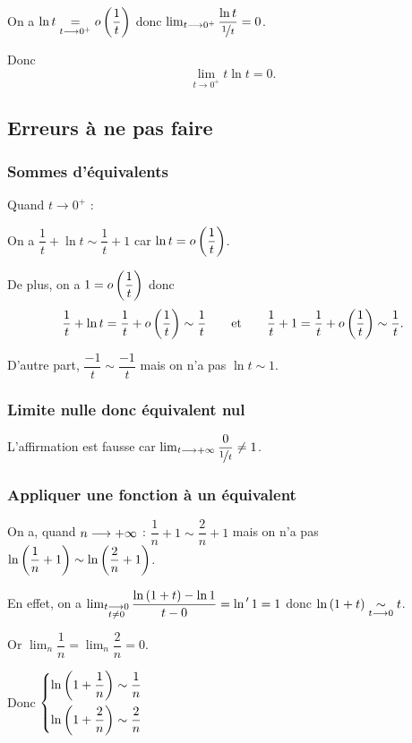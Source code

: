 \begin{corr}
On a \(\ln t\egqd{t\to0^+}\o{\dfrac{1}{t}}\) donc \(\lim_{t\to0^+}\dfrac{\ln t}{\nicefrac{1}{t}}=0\).

Donc \[\lim_{t\to0^+}t\ln t=0.\]
\end{corr}

\subsection{Erreurs à ne pas faire}

\subsubsection{Sommes d'équivalents}

Quand \(t\to0^+\) :

On a \(\dfrac{1}{t}+\ln t\sim\dfrac{1}{t}+1\) car \(\ln t=\o{\dfrac{1}{t}}\).

De plus, on a \(1=\o{\dfrac{1}{t}}\) donc \[\dfrac{1}{t}+\ln t=\dfrac{1}{t}+\o{\dfrac{1}{t}}\sim\dfrac{1}{t}\qquad\text{et}\qquad\dfrac{1}{t}+1=\dfrac{1}{t}+\o{\dfrac{1}{t}}\sim\dfrac{1}{t}.\]

D'autre part, \(\dfrac{-1}{t}\sim\dfrac{-1}{t}\) mais on n'a pas \(\ln t\sim1\).

\subsubsection{Limite nulle donc équivalent nul}

L'affirmation  est fausse car \(\lim_{t\to\pinf}\dfrac{0}{\nicefrac{1}{t}}\not=1\).

\subsubsection{Appliquer une fonction à un équivalent}

On a, quand \(n\to\pinf\) : \(\dfrac{1}{n}+1\sim\dfrac{2}{n}+1\) mais on n'a pas \(\ln\paren{\dfrac{1}{n}+1}\sim\ln\paren{\dfrac{2}{n}+1}\).

En effet, on a \(\lim_{\substack{t\to0 \\ t\not=0}}\dfrac{\ln\paren{1+t}-\ln1}{t-0}=\ln\prim1=1\) donc \(\ln\paren{1+t}\simqd{t\to0}t\).

Or \(\lim_n\dfrac{1}{n}=\lim_n\dfrac{2}{n}=0\).

Donc \(\begin{dcases}
\ln\paren{1+\dfrac{1}{n}}\sim\dfrac{1}{n} \\
\ln\paren{1+\dfrac{2}{n}}\sim\dfrac{2}{n}
\end{dcases}\)


